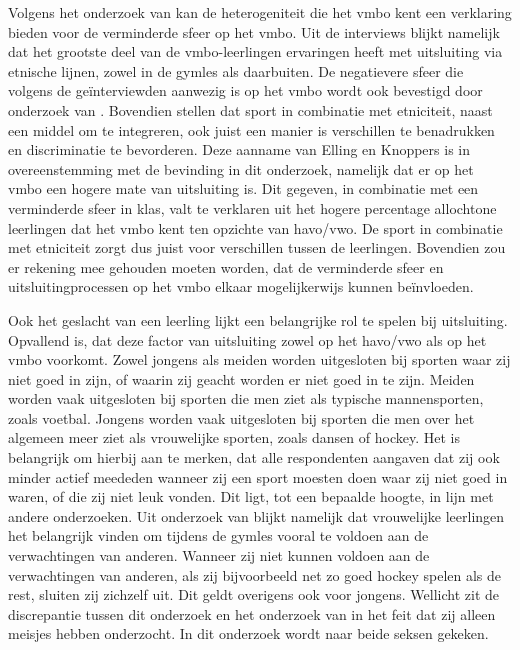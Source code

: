 \documentclass[a4paper,12pt]{memoir}
\begin{document}
Volgens het onderzoek van \textcite{wodc} kan de heterogeniteit die het vmbo kent een verklaring bieden voor de verminderde sfeer op het vmbo. Uit de interviews blijkt namelijk dat het grootste deel van de vmbo-leerlingen ervaringen heeft met uitsluiting via etnische lijnen, zowel in de gymles als daarbuiten. De negatievere sfeer die volgens de geïnterviewden aanwezig is op het vmbo wordt ook bevestigd door onderzoek van \textcite{ggd}. Bovendien stellen \textcite{elling} dat sport in combinatie met etniciteit, naast een middel om te integreren, ook juist een manier is verschillen te benadrukken en discriminatie te bevorderen. Deze aanname van Elling en Knoppers is in overeenstemming met de bevinding in dit onderzoek, namelijk dat er op het vmbo een hogere mate van uitsluiting is. Dit gegeven, in combinatie met een verminderde sfeer in klas, valt te verklaren uit het hogere percentage allochtone leerlingen dat het vmbo kent ten opzichte van havo/vwo. De sport in combinatie met etniciteit zorgt dus juist voor verschillen tussen de leerlingen. Bovendien zou er rekening mee gehouden moeten worden, dat de verminderde sfeer en uitsluitingprocessen op het vmbo elkaar mogelijkerwijs kunnen beïnvloeden. 

Ook het geslacht van een leerling lijkt een belangrijke rol te spelen bij uitsluiting. Opvallend is, dat deze factor van uitsluiting zowel op het havo/vwo als op het vmbo voorkomt. Zowel jongens als meiden worden uitgesloten bij sporten waar zij niet goed in zijn, of waarin zij geacht worden er niet goed in te zijn. Meiden worden vaak uitgesloten bij sporten die men ziet als typische mannensporten, zoals voetbal. Jongens worden vaak uitgesloten bij sporten die men over het algemeen meer ziet als vrouwelijke sporten, zoals dansen of hockey. Het is belangrijk om hierbij aan te merken, dat alle respondenten aangaven dat zij ook minder actief meededen wanneer zij een sport moesten doen waar zij niet goed in waren, of die zij niet leuk vonden. Dit ligt, tot een bepaalde hoogte, in lijn met andere onderzoeken. Uit onderzoek van \textcite{donovan} blijkt namelijk dat vrouwelijke leerlingen het belangrijk vinden om tijdens de gymles vooral te voldoen aan de verwachtingen van anderen. Wanneer zij niet kunnen voldoen aan de verwachtingen van anderen, als zij bijvoorbeeld net zo goed hockey spelen als de rest, sluiten zij zichzelf uit. Dit geldt overigens ook voor jongens. Wellicht zit de discrepantie tussen dit onderzoek en het onderzoek van \textcite{donovan} in het feit dat zij alleen meisjes hebben onderzocht. In dit onderzoek wordt naar beide seksen gekeken.
\end{document}
